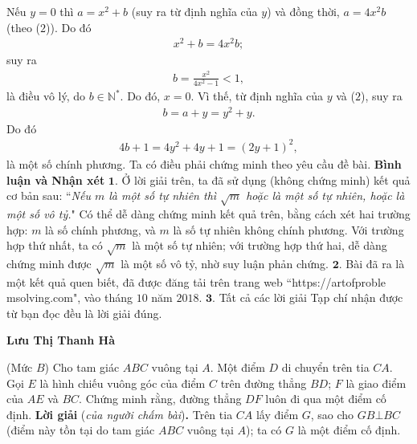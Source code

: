\begin{multicols}{2}
	Nếu $y = 0$ thì $a = x^2 + b$  (suy ra từ định nghĩa của $y$) và đồng thời, $a = 4x^2b$  (theo ($2$)). Do đó
	\begin{align*}
		{x^2} + b = 4{x^2}b;
	\end{align*}
	suy ra
	\begin{align*}
		b = \frac{{{x^2}}}{{4{x^2} - 1}} < 1,
	\end{align*}
	là điều vô lý, do $b \in \mathbb{N^*}$.
	\vskip 0.05cm 
	Do đó, $x = 0$. Vì thế, từ định nghĩa của $y$ và ($2$), suy ra
	\begin{align*}
		b = a + y = {y^2} + y.
	\end{align*}
	Do đó
	\begin{align*}
		4b + 1 = 4{y^2} + 4y + 1 = {\left( {2y + 1} \right)^2},
	\end{align*}
	là một số chính phương.
	\vskip 0.05cm
	Ta có điều phải chứng minh theo yêu cầu đề bài.
	\vskip 0.05cm
	\textbf{\color{thachthuctoanhoc}Bình luận và Nhận xét}
	\vskip 0.05cm
	$\pmb{1.}$ Ở lời giải trên, ta đã sử dụng (không chứng minh) kết quả cơ bản sau:
	\vskip 0.05cm
	``\textit{Nếu $m$ là một số tự nhiên thì  $\sqrt{m}$ hoặc là một số tự nhiên, hoặc là một số vô tỷ.}"
	\vskip 0.05cm
	Có thể dễ dàng chứng minh kết quả trên, bằng cách xét hai trường hợp: $m$ là số chính phương, và $m$ là số tự nhiên không chính phương. Với trường hợp thứ nhất, ta có $\sqrt{m}$ là một số tự nhiên; với trường hợp thứ hai, dễ dàng chứng minh được  $\sqrt{m}$ là một số vô tỷ, nhờ suy luận phản chứng.
	\vskip 0.05cm
	$\pmb{2.}$ Bài đã ra là một kết quả quen biết, đã được đăng tải trên trang web
	``{\color{thachthuctoanhoc}https://artofproble\\msolving.com}",
	vào tháng $10$ năm $2018$.
	\vskip 0.05cm
	$\pmb{3.}$ Tất cả các lời giải Tạp chí nhận được từ bạn đọc đều là lời giải đúng.
	\begin{flushright}
		\textbf{\color{thachthuctoanhoc}Lưu Thị Thanh Hà}
	\end{flushright}
	{}
	(Mức $B$) Cho tam giác $ABC$ vuông tại $A$. Một điểm $D$ di chuyển trên tia $CA$. Gọi $E$ là hình chiếu vuông góc của điểm $C$ trên đường thẳng $BD$; $F$ là giao điểm của $AE$ và $BC$. Chứng minh rằng, đường thẳng $DF$ luôn đi qua một điểm cố định.
	\vskip 0.05cm
	\textbf{\color{thachthuctoanhoc}Lời giải} (\textit{của người chấm bài})\textbf{\color{thachthuctoanhoc}.}
	\vskip 0.05cm
	Trên tia $CA$ lấy điểm $G$, sao cho $GB \bot BC$ (điểm này tồn tại do tam giác $ABC$ vuông tại $A$); ta có $G$ là một điểm cố định.
	\vskip 0.05cm

\end{multicols}
